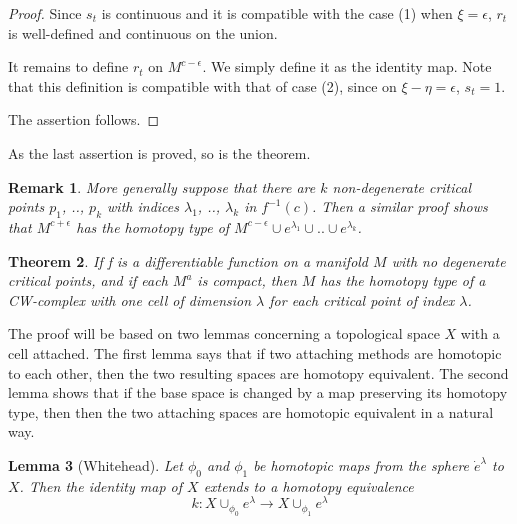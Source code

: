 \documentclass[a4paper,11pt,reqno]{amsart}
\newtheorem{thm}{Theorem}[section]
\newtheorem{lem}[thm]{Lemma}
\newtheorem{rmk}[thm]{Remark}
\begin{document}
\begin{proof}
  Since $s_t$ is continuous and it is compatible with the case (1) when $\xi =
  \epsilon$, $r_t$ is well-defined and continuous on the union.

  It remains to define $r_t$ on $M^{c-\epsilon}$. We simply define it as the
  identity map. Note that this definition is compatible with that of case (2),
  since on $\xi-\eta=\epsilon$, $s_t = 1$.

  The assertion follows.
\end{proof}

As the last assertion is proved, so is the theorem.

\begin{rmk}
  \label{3.3}
  More generally suppose that there are $k$ non-degenerate critical points
  $p_1$, .., $p_k$ with indices $\lambda_1$, .., $\lambda_k$ in
  $f^{-1}(c)$. Then a similar proof shows that $M^{c+\epsilon}$ has the homotopy
  type of $M^{c-\epsilon}\cup e^{\lambda_1}\cup .. \cup e^{\lambda_k}$.
\end{rmk}

\begin{thm}
  \label{main}
  If f is a differentiable function on a manifold $M$ with no degenerate
  critical points, and if each $M^a$ is compact, then $M$ has the homotopy type
  of a CW-complex with one cell of dimension $\lambda$ for each critical point
  of index $\lambda$.
\end{thm}

The proof will be based on two lemmas concerning a topological space $X$ with a
cell attached. The first lemma says that if two attaching methods are homotopic
to each other, then the two resulting spaces are homotopy equivalent. The second
lemma shows that if the base space is changed by a map preserving its homotopy
type, then then the two attaching spaces are homotopic equivalent in a natural
way.

\begin{lem}[Whitehead]
  \label{whitehead}
  Let $\phi_0$ and $\phi_1$ be homotopic maps from the sphere $\dot{e}^\lambda$
  to $X$. Then the identity map of $X$ extends to a homotopy equivalence
  \begin{equation}
    k: X \cup_{\phi_0} e^\lambda \to X \cup_{\phi_1} e^\lambda
  \end{equation}
\end{lem}
\end{document}
